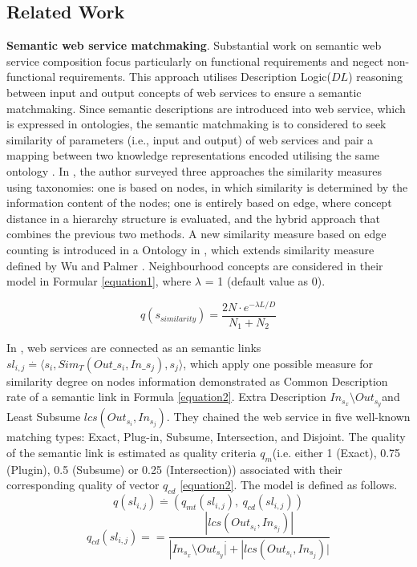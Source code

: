 \documentclass{llncs}
\begin{document}
\subsection{Related Work}
\textbf{Semantic web service matchmaking}. Substantial work \cite{bansal2016generalized,mier2015integrated} on semantic web service composition focus particularly on functional requirements and negect non-functional requirements. This approach utilises Description Logic($DL$) \cite{baader2003description} reasoning between input and output concepts of web services to ensure a semantic matchmaking. Since semantic descriptions are introduced into web service, which is expressed in ontologies, the semantic matchmaking is to considered to seek similarity of parameters (i.e., input and output) of web services and pair a mapping between two knowledge representations encoded utilising the same ontology \cite{lecue2006formal}. In \cite{shet2012new}, the author surveyed three approaches the similarity measures using taxonomies: one is based on nodes, in which similarity is determined by the information content of the nodes; one is entirely based on edge, where concept distance in a hierarchy structure is evaluated,  and the hybrid approach that combines the previous two methods. A new similarity measure based on edge counting is introduced in a Ontology in \cite{shet2012new}, which extends similarity measure defined by Wu and Palmer \cite{wu1994verbs}. Neighbourhood concepts are considered in their model in Formular \ref{equation1}, where $\lambda$ = 1 (default value as 0).

\begin{equation}
q(s_ {similarity}){=} \frac{2N \cdot e^{-\lambda L/D} }{N_{1}+N_{2}}
\label{equation1}
\end{equation}

In \cite{lecue2009optimizing}, web services are connected as an semantic links $sl_{i,j} \stackrel{.}{=} \langle s_{i}, Sim_{T}(Out\_s_i,In\_s_j),s_{j}  \rangle$, which apply one possible measure for similarity degree on nodes information demonstrated as Common Description rate of a semantic link in Formula \ref{equation2}. Extra Description $In_{s_{x}} \setminus Out_{s_{y}}$and Least Subsume $lcs(Out_{s_i},In_{s_j})$. They chained the web service in five well-known matching types: Exact, Plug-in, Subsume, Intersection, and Disjoint. The quality of the semantic link is estimated as quality criteria $q_{m}$(i.e. either 1 (Exact), 0.75 (Plugin), 0.5 (Subsume) or 0.25 (Intersection)) associated with their corresponding quality of vector $q_{cd}$ \ref{equation2}. The model is defined as follows.
\begin{equation}
\label{equation2}
q(sl{_{i,j}}) \stackrel{.}{=} (q_{mt}(sl_{i,j}), \  q_{cd}(sl_{i,j}))
\end{equation}
\begin{equation}
q_{cd}(sl{_{i,j}})={=} \frac{|lcs(Out_{s_i},In_{s_j})|}{|In_{s_{x}} \setminus Out_{s{_y}} \stackrel{.}| +|lcs(Out_{s_i},In_{s_j})| }
 \label{equation3}
\end{equation}
\end{document}
